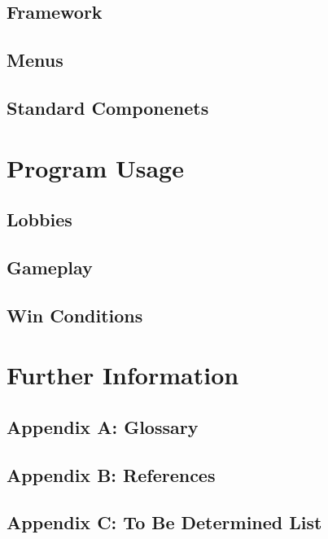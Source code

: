 \documentclass{scrreprt}
\begin{document}
\section{Framework}

\section{Menus}

\section{Standard Componenets}

\chapter{Program Usage}

\section{Lobbies}

\section{Gameplay}

\section{Win Conditions}

\chapter{Further Information}

\section{Appendix A: Glossary}

\section{Appendix B: References}

\section{Appendix C: To Be Determined List}
\end{document}
